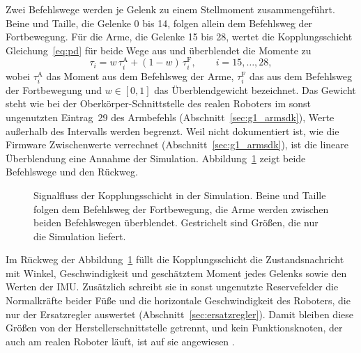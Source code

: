 Zwei Befehlswege werden je Gelenk zu einem Stellmoment zusammengeführt.
Beine und Taille, die Gelenke 0 bis 14, folgen allein dem Befehlsweg der Fortbewegung.
Für die Arme, die Gelenke 15 bis 28, wertet die Kopplungsschicht Gleichung~\ref{eq:pd} für beide Wege aus und überblendet die Momente zu
\begin{equation}
  \tau_i = w\,\tau_i^{\mathrm{A}} + (1-w)\,\tau_i^{\mathrm{F}}, \qquad i = 15, \dots, 28,
  \label{eq:ueberblendung}
\end{equation}
%
wobei $\tau_i^{\mathrm{A}}$ das Moment aus dem Befehlsweg der Arme, $\tau_i^{\mathrm{F}}$ das aus dem Befehlsweg der Fortbewegung und $w \in [0, 1]$ das Überblendgewicht bezeichnet.
Das Gewicht steht wie bei der Oberkörper-Schnittstelle des realen Roboters im sonst ungenutzten Eintrag~29 des Armbefehls (Abschnitt~\ref{sec:g1_armsdk}), Werte außerhalb des Intervalls werden begrenzt.
Weil nicht dokumentiert ist, wie die Firmware Zwischenwerte verrechnet (Abschnitt~\ref{sec:g1_armsdk}), ist die lineare Überblendung eine Annahme der Simulation.
Abbildung~\ref{fig:bridge} zeigt beide Befehlswege und den Rückweg.

\begin{figure}[htbp]
  \centering
  
  \caption[Signalfluss der Kopplungsschicht]{Signalfluss der Kopplungsschicht in der Simulation. Beine und Taille folgen dem Befehlsweg der Fortbewegung, die Arme werden zwischen beiden Befehlswegen überblendet. Gestrichelt sind Größen, die nur die Simulation liefert.}
  \label{fig:bridge}
\end{figure}

Im Rückweg der Abbildung~\ref{fig:bridge} füllt die Kopplungsschicht die Zustandsnachricht mit Winkel, Geschwindigkeit und geschätztem Moment jedes Gelenks sowie den Werten der IMU.
Zusätzlich schreibt sie in sonst ungenutzte Reservefelder die Normalkräfte beider Füße und die horizontale Geschwindigkeit des Roboters, die nur der Ersatzregler auswertet (Abschnitt~\ref{sec:ersatzregler}).
Damit bleiben diese Größen von der Herstellerschnittstelle getrennt, und kein Funktionsknoten, der auch am realen Roboter läuft, ist auf sie angewiesen .

